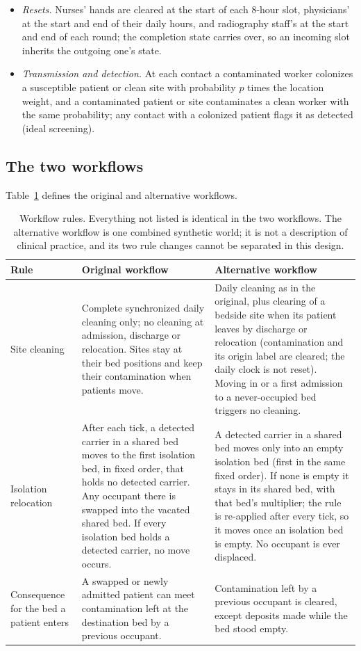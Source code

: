 \documentclass[11pt]{article}
\begin{document}
\begin{itemize}
Contacts within a zone add none.
\item \emph{Resets.} Nurses' hands are cleared at the start of each 8-hour slot,
physicians' at the start and end of their daily hours, and radiography staff's at
the start and end of each round; the completion state carries over, so an incoming
slot inherits the outgoing one's state.
\item \emph{Transmission and detection.} At each contact a contaminated worker
colonizes a susceptible patient or clean site with probability $p$ times the
location weight, and a contaminated patient or site contaminates a clean worker
with the same probability; any contact with a colonized patient flags it as
detected (ideal screening).
\end{itemize}

\subsection{The two workflows}\label{sec:s-workflows}
Table~\ref{tab:workflows} defines the original and alternative workflows.
\begin{table}[htbp]\centering\small
\caption{Workflow rules. Everything not listed is identical in the two workflows. The alternative workflow is one combined synthetic world; it is not a description of clinical practice, and its two rule changes cannot be separated in this design.}\label{tab:workflows}
\begin{tabular}{>{\raggedright\arraybackslash}p{.17\linewidth}>{\raggedright\arraybackslash}p{.37\linewidth}>{\raggedright\arraybackslash}p{.37\linewidth}}\toprule
Rule & Original workflow & Alternative workflow\\\midrule
Site cleaning & Complete synchronized daily cleaning only; no cleaning at admission, discharge or relocation. Sites stay at their bed positions and keep their contamination when patients move. & Daily cleaning as in the original, plus clearing of a bedside site when its patient leaves by discharge or relocation (contamination and its origin label are cleared; the daily clock is not reset). Moving in or a first admission to a never-occupied bed triggers no cleaning.\\
Isolation relocation & After each tick, a detected carrier in a shared bed moves to the first isolation bed, in fixed order, that holds no detected carrier. Any occupant there is swapped into the vacated shared bed. If every isolation bed holds a detected carrier, no move occurs. & A detected carrier in a shared bed moves only into an empty isolation bed (first in the same fixed order). If none is empty it stays in its shared bed, with that bed's multiplier; the rule is re-applied after every tick, so it moves once an isolation bed is empty. No occupant is ever displaced.\\
Consequence for the bed a patient enters & A swapped or newly admitted patient can meet contamination left at the destination bed by a previous occupant. & Contamination left by a previous occupant is cleared, except deposits made while the bed stood empty.\\
\bottomrule\end{tabular}
\end{table}
\end{document}
